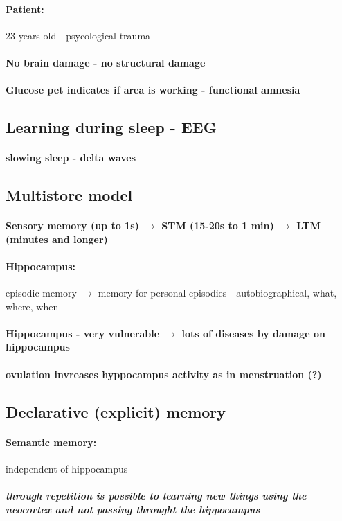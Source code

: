 \documentclass[12pt,article,oneside,a4paper]{memoir}
\begin{document}
\paragraph{Patient:} 23 years old - psycological trauma
\paragraph{No brain damage - no structural damage}
\paragraph{Glucose pet indicates if area is working - functional amnesia}

\subsection{Learning during sleep - EEG}
\paragraph{slowing sleep - delta waves}

\subsection{Multistore model}
\paragraph{Sensory memory (up to 1s) $\rightarrow$ STM (15-20s to 1 min) $\rightarrow$ LTM (minutes and longer)}
\paragraph{Hippocampus:} episodic memory $\rightarrow$ memory for personal episodies - autobiographical, what, where, when
\paragraph{Hippocampus - very vulnerable $\rightarrow$ lots of diseases by damage on hippocampus}
\paragraph{ovulation invreases hyppocampus activity as in menstruation (?)}
\subsection{Declarative (explicit) memory }
\paragraph{Semantic memory:} independent of hippocampus
\subparagraph{through repetition is possible to learning new things using the neocortex and not passing throught the hippocampus}
\end{document}
